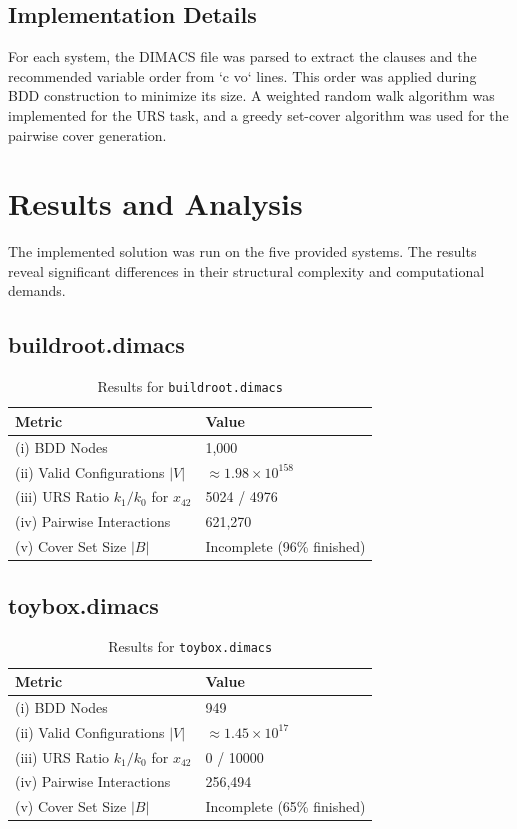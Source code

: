\documentclass{article}
\begin{document}
\subsection{Implementation Details}
For each system, the DIMACS file was parsed to extract the clauses and the recommended variable order from `c vo` lines. This order was applied during BDD construction to minimize its size. A weighted random walk algorithm was implemented for the URS task, and a greedy set-cover algorithm was used for the pairwise cover generation.

\section{Results and Analysis}
The implemented solution was run on the five provided systems. The results reveal significant differences in their structural complexity and computational demands.

\subsection{buildroot.dimacs}
\begin{table}[H]
\centering
\caption{Results for \texttt{buildroot.dimacs}}
\begin{tabular}{l l}
\toprule
\textbf{Metric} & \textbf{Value} \\
\midrule
(i) BDD Nodes & 1,000 \\
(ii) Valid Configurations $|V|$ & $\approx 1.98 \times 10^{158}$ \\
(iii) URS Ratio $k_1/k_0$ for $x_{42}$ & 5024 / 4976 \\
(iv) Pairwise Interactions & 621,270 \\
(v) Cover Set Size $|B|$ & Incomplete (96\% finished) \\
\bottomrule
\end{tabular}
\end{table}

\subsection{toybox.dimacs}
\begin{table}[H]
\centering
\caption{Results for \texttt{toybox.dimacs}}
\begin{tabular}{l l}
\toprule
\textbf{Metric} & \textbf{Value} \\
\midrule
(i) BDD Nodes & 949 \\
(ii) Valid Configurations $|V|$ & $\approx 1.45 \times 10^{17}$ \\
(iii) URS Ratio $k_1/k_0$ for $x_{42}$ & 0 / 10000 \\
(iv) Pairwise Interactions & 256,494 \\
(v) Cover Set Size $|B|$ & Incomplete (65\% finished) \\
\bottomrule
\end{tabular}
\end{table}
\end{document}
